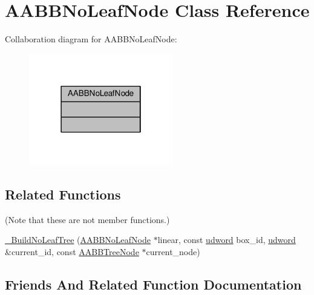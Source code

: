 \hypertarget{classAABBNoLeafNode}{}\section{A\+A\+B\+B\+No\+Leaf\+Node Class Reference}
\label{classAABBNoLeafNode}


Collaboration diagram for A\+A\+B\+B\+No\+Leaf\+Node\+:
\nopagebreak
\begin{figure}[H]
\begin{center}
\leavevmode
\includegraphics[width=178pt]{d9/d2a/classAABBNoLeafNode__coll__graph}
\end{center}
\end{figure}
\subsection*{Related Functions}
(Note that these are not member functions.) \begin{DoxyCompactItemize}
\item 
\hyperlink{classAABBNoLeafNode_a72bbc7c9d7839051c0e0ffb808f57d2d}{\+\_\+\+Build\+No\+Leaf\+Tree} (\hyperlink{classOpcode_1_1AABBNoLeafNode}{A\+A\+B\+B\+No\+Leaf\+Node} $\ast$linear, const \hyperlink{IceTypes_8h_a44c6f1920ba5551225fb534f9d1a1733}{udword} box\+\_\+id, \hyperlink{IceTypes_8h_a44c6f1920ba5551225fb534f9d1a1733}{udword} \&current\+\_\+id, const \hyperlink{classOpcode_1_1AABBTreeNode}{A\+A\+B\+B\+Tree\+Node} $\ast$current\+\_\+node)
\end{DoxyCompactItemize}


\subsection{Friends And Related Function Documentation}
